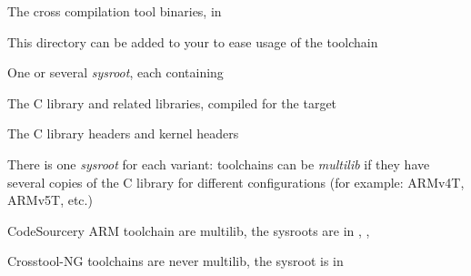   \startitemize
  \item The cross compilation tool binaries, in 
    \startitemize
    \item This directory can be added to your  to ease
      usage of the toolchain
    \stopitemize
  \item One or several {\em sysroot}, each containing
    \startitemize
    \item The C library and related libraries, compiled for the target
    \item The C library headers and kernel headers
    \stopitemize
  \item There is one {\em sysroot} for each variant: toolchains can be
    {\em multilib} if they have several copies of the C library for
    different configurations (for example: ARMv4T, ARMv5T, etc.)
    \startitemize
    \item CodeSourcery ARM toolchain are multilib, the sysroots are in
      ,
      ,
    \item Crosstool-NG toolchains are never multilib, the sysroot is
      in 
    \stopitemize
  \stopitemize

